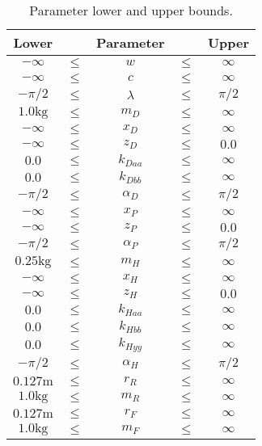 \documentclass{bmd2019p}
\begin{document}
\begin{table}
  \caption{Parameter lower and upper bounds.}
  \label{tab:bounds}
  \centering
  \begin{tabular}{ccccc}
    \toprule
    Lower & & Parameter & & Upper \\
    \midrule
    $-\infty$ & $\leq$ & $w       $  &  $\leq$  &  $\infty$ \\
    $-\infty$ & $\leq$ & $c       $  &  $\leq$  &  $\infty$ \\
    $-\pi/2 $ & $\leq$ & $\lambda $  &  $\leq$  &  $\pi/2$ \\
    $1.0\si{\kilogram}$ & $\leq$ & $m_D     $  &  $\leq$  &  $\infty$ \\
    $-\infty$ & $\leq$ & $x_D     $  &  $\leq$  &  $\infty$ \\
    $-\infty$ & $\leq$ & $z_D     $  &  $\leq$  &  $0.0$    \\
    $0.0    $ & $\leq$ & $k_{Daa} $  &  $\leq$  &  $\infty$ \\
    $0.0    $ & $\leq$ & $k_{Dbb} $  &  $\leq$  &  $\infty$ \\
    $-\pi/2 $ & $\leq$ & $\alpha_D$  &  $\leq$  &  $\pi/2$  \\
    $-\infty$ & $\leq$ & $x_P     $  &  $\leq$  &  $\infty$ \\
    $-\infty$ & $\leq$ & $z_P     $  &  $\leq$  &  $0.0$    \\
    $-\pi/2 $ & $\leq$ & $\alpha_P$  &  $\leq$  &  $\pi/2$ \\
    $0.25\si{\kilogram} $ & $\leq$ & $m_H     $  &  $\leq$  &  $\infty$ \\
    $-\infty$ & $\leq$ & $x_H     $  &  $\leq$  &  $\infty$ \\
    $-\infty$ & $\leq$ & $z_H     $  &  $\leq$  &  $0.0$ \\
    $0.0    $ & $\leq$ & $k_{Haa} $  &  $\leq$  &  $\infty$ \\
    $0.0    $ & $\leq$ & $k_{Hbb} $  &  $\leq$  &  $\infty$ \\
    $0.0    $ & $\leq$ & $k_{Hyy} $  &  $\leq$  &  $\infty$ \\
    $-\pi/2 $ & $\leq$ & $\alpha_H$  &  $\leq$  &  $\pi/2$ \\
    $0.127\si{\meter}$ & $\leq$ & $r_R     $  &  $\leq$  &  $\infty$ \\
    $1.0\si{\kilogram}$ & $\leq$ & $m_R     $  &  $\leq$  &  $\infty$ \\
    $0.127\si{\meter}$ & $\leq$ & $r_F     $  &  $\leq$  &  $\infty$ \\
    $1.0\si{\kilogram}$ & $\leq$ & $m_F     $  &  $\leq$  &  $\infty$ \\
    \bottomrule
  \end{tabular}
\end{table}
\end{document}
